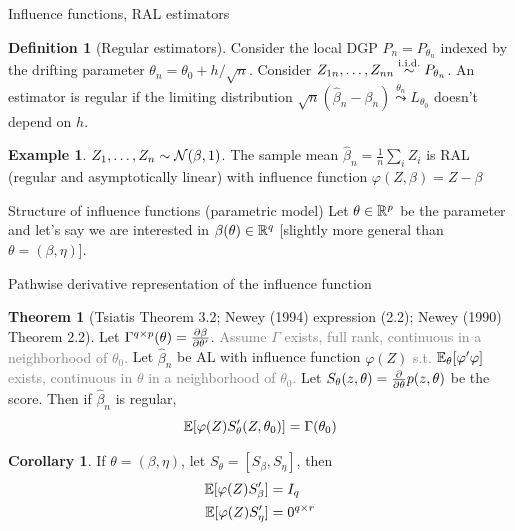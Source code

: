 \documentclass[10pt,aspectratio=169,handout]{beamer}
\theoremstyle{definition}
\newtheorem{thm}{Theorem}
\newtheorem{defn}{Definition}
\newtheorem{cor}{Corollary}
\newtheorem{ex}{Example}
\newcommand{\light}[1]{\textcolor{gray}{#1}}
\begin{document}
\begin{frame}{Influence functions, RAL estimators}
    \begin{defn}[Regular estimators]
    Consider the \alert{local} DGP $P_n = P_{\theta_n}$ indexed by the
    drifting parameter $\theta_n = \theta_0 + h/\sqrt{n}$. Consider $Z_
    {1n},\ldots, Z_{nn} \overset{\mathrm{i.i.d.}}{\sim} P_{\theta_n}$. An estimator is 
    \alert{regular} if the limiting distribution
     $\sqrt{n}(\hat\beta_n - \beta_n) \overset{\theta_n}{\leadsto} L_
    {\theta_0}$ doesn't depend on $h$.
  \end{defn}
  
  \begin{ex}
    $Z_1,\ldots, Z_n \sim \mathcal{N}(\beta,1)$. The sample mean $\hat\beta_n =
    \frac{1}{n}\sum_i Z_i$ is RAL (regular and asymptotically linear) with
    influence function $\varphi(Z,
    \beta) = Z-\beta$
  \end{ex}
\end{frame}

\begin{frame}{Structure of influence functions (parametric model)}
\small
  Let $\theta \in \mathbb{R}^p$ be the parameter and let's say we are interested in
  $\beta
  (\theta) \in \mathbb{R}^q$ [slightly more general than $\theta = (\beta, \eta)$].
  
  \alert{Pathwise derivative representation of the influence function}
  \begin{thm}[Tsiatis Theorem 3.2; Newey (1994) expression (2.2); Newey 
    (1990) Theorem 2.2]
    Let $\Gamma^{q\times p}(\theta) = \frac{\partial{\beta}}{\partial{\theta'}}$.  
    \light{Assume $\Gamma$ exists, full rank, continuous in a neighborhood
    of $\theta_0$.} Let $\hat \beta_n$ be AL with influence function
    $\varphi(Z)$ \light{s.t. $\mathbb{E}_\theta[\varphi'\varphi]$ exists,
    continuous in $\theta$ in a neighborhood of $\theta_0$.} 
    Let $S_\theta(z,\theta) = \frac{\partial{}}{\partial{\theta}} p(z,\theta)$ be the score.
    Then if
    $\hat\beta_n$ is regular, \[
    \mathbb{E}[\varphi(Z) S_\theta'(Z,\theta_0)] = \Gamma(\theta_0)
    \]
  \end{thm}
  
  \begin{cor}
    If $\theta = (\beta, \eta)$, let $S_\theta = [S_\beta, S_\eta]$, then 
    \begin{align*}
    \mathbb{E}[\varphi(Z)S_\beta'] &= I_q \\ \mathbb{E}[\varphi(Z)S_\eta'] &= 0^{q\times r}
    \end{align*}
  \end{cor}
  
\end{frame}
\end{document}
